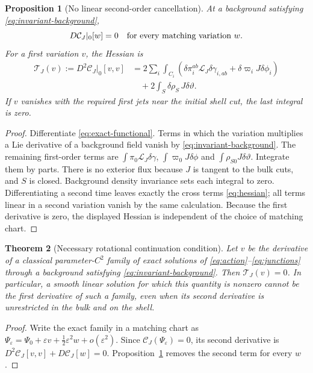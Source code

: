 \documentclass[11pt]{article}
\newtheorem{theorem}{Theorem}[section]
\newtheorem{proposition}[theorem]{Proposition}
\theoremstyle{remark}
\newcommand{\Lie}{\mathcal L}
\begin{document}
\begin{proposition}[No linear second-order cancellation]
\label{prop:derivatives}
At a background satisfying \eqref{eq:invariant-background},
\begin{equation}
 D\mathcal C_J|_0[w]=0
 \quad\hbox{for every matching variation }w.
 \label{eq:first-zero}
\end{equation}
For a first variation $v$, the Hessian is
\begin{align}
 \mathcal T_J(v):=D^2\mathcal C_J|_0[v,v]
 &=2\sum_i\int_{C_i}
    (\delta\pi_i^{ab}\Lie_J\delta\gamma_{i,ab}
                +\delta\varpi_iJ\delta\phi_i)\nonumber\\
 &\quad+2\int_S\delta\rho_S\,J\delta\vartheta.
 \label{eq:hessian}
\end{align}
If $v$ vanishes with the required first jets near the initial shell cut,
the last integral is zero.
\end{proposition}
\begin{proof}
Differentiate \eqref{eq:exact-functional}. Terms in which the variation
multiplies a Lie derivative of a background field vanish by
\eqref{eq:invariant-background}. The remaining first-order terms are
$\int\pi_0\Lie_J\delta\gamma$,
$\int\varpi_0J\delta\phi$ and $\int\rho_{S0}J\delta\vartheta$.
Integrate them by parts. There is no exterior flux because $J$ is tangent
to the bulk cuts, and $S$ is closed. Background density invariance sets
each integral to zero. Differentiating a second time leaves exactly the
cross terms \eqref{eq:hessian}; all terms linear in a second variation
vanish by the same calculation. Because the first derivative is zero,
the displayed Hessian is independent of the choice of matching chart.
\end{proof}

\begin{theorem}[Necessary rotational continuation condition]
\label{thm:obstruction}
Let $v$ be the derivative of a classical parameter-$C^2$ family of exact
solutions of \eqref{eq:action}--\eqref{eq:junctions} through a background
satisfying \eqref{eq:invariant-background}. Then $\mathcal T_J(v)=0$.
In particular, a smooth linear solution for which this quantity is nonzero
cannot be the first derivative of such a family, even when its second
derivative is unrestricted in the bulk and on the shell.
\end{theorem}
\begin{proof}
Write the exact family in a matching chart as
$\Psi_\varepsilon=\Psi_0+\varepsilon v+
\tfrac12\varepsilon^2w+o(\varepsilon^2)$.
Since $\mathcal C_J(\Psi_\varepsilon)=0$, its second derivative is
$D^2\mathcal C_J[v,v]+D\mathcal C_J[w]=0$.
Proposition~\ref{prop:derivatives} removes the second term for every $w$.
\end{proof}
\end{document}
